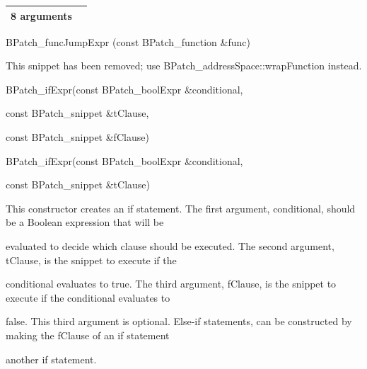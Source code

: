 {{{{{\begin{center}
\begin{supertabular}{|m{1.0462599in}|m{2.94136in}|}
{ 8 arguments}\\\hline

\end{supertabular}

\end{center}



\bigskip



{

BPatch_funcJumpExpr (const BPatch_function &func)}



{

This snippet has been removed; use BPatch_addressSpace::wrapFunction instead.}





\bigskip



{

BPatch_ifExpr(const BPatch_boolExpr &conditional,\newline

const BPatch_snippet &tClause,\newline

const BPatch_snippet &fClause)}



{

BPatch_ifExpr(const BPatch_boolExpr &conditional,\newline

const BPatch_snippet &tClause)}



{

This constructor creates an if statement. The first argument, conditional, should be a Boolean expression that will be

evaluated to decide which clause should be executed. The second argument, tClause, is the snippet to execute if the

conditional evaluates to true. The third argument, fClause, is the snippet to execute if the conditional evaluates to

false. This third argument is optional. Else-if statements, can be constructed by making the fClause of an if statement

another if statement.}





\bigskip



}}}}}
